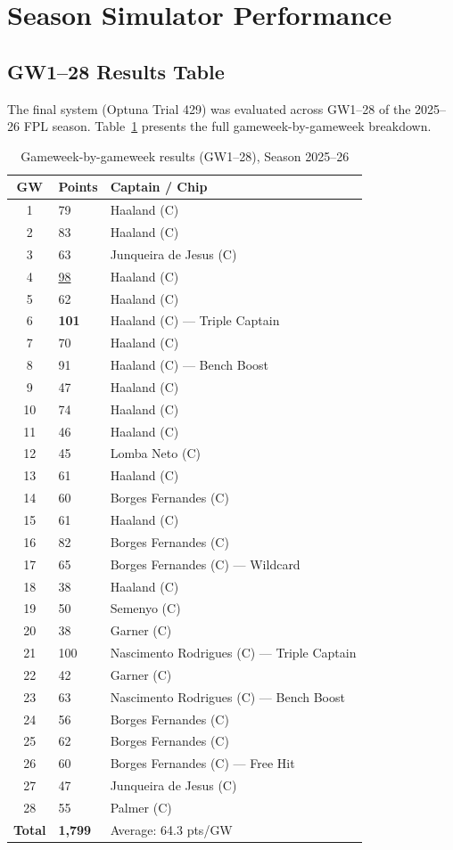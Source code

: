 \section{Season Simulator Performance}

\subsection{GW1--28 Results Table}

The final system (Optuna Trial 429) was evaluated across GW1--28 of the 2025--26 FPL season. Table~\ref{tab:gw_results_en} presents the full gameweek-by-gameweek breakdown.

\begin{table}[h]
\centering
\caption{Gameweek-by-gameweek results (GW1--28), Season 2025--26}
\label{tab:gw_results_en}
\begin{tabular}{clp{6.5cm}}
\toprule
\textbf{GW} & \textbf{Points} & \textbf{Captain / Chip} \\
\midrule
1  & 79  & Haaland (C) \\
2  & 83  & Haaland (C) \\
3  & 63  & Junqueira de Jesus (C) \\
4  & \underline{98}  & Haaland (C) \\
5  & 62  & Haaland (C) \\
6  & \textbf{101} & Haaland (C) — Triple Captain \\
7  & 70  & Haaland (C) \\
8  & 91  & Haaland (C) — Bench Boost \\
9  & 47  & Haaland (C) \\
10 & 74  & Haaland (C) \\
11 & 46  & Haaland (C) \\
12 & 45  & Lomba Neto (C) \\
13 & 61  & Haaland (C) \\
14 & 60  & Borges Fernandes (C) \\
15 & 61  & Haaland (C) \\
16 & 82  & Borges Fernandes (C) \\
17 & 65  & Borges Fernandes (C) — Wildcard \\
18 & 38  & Haaland (C) \\
19 & 50  & Semenyo (C) \\
20 & 38  & Garner (C) \\
21 & 100 & Nascimento Rodrigues (C) — Triple Captain \\
22 & 42  & Garner (C) \\
23 & 63  & Nascimento Rodrigues (C) — Bench Boost \\
24 & 56  & Borges Fernandes (C) \\
25 & 62  & Borges Fernandes (C) \\
26 & 60  & Borges Fernandes (C) — Free Hit \\
27 & 47  & Junqueira de Jesus (C) \\
28 & 55  & Palmer (C) \\
\midrule
\textbf{Total} & \textbf{1,799} & Average: 64.3 pts/GW \\
\bottomrule
\end{tabular}
\end{table}

